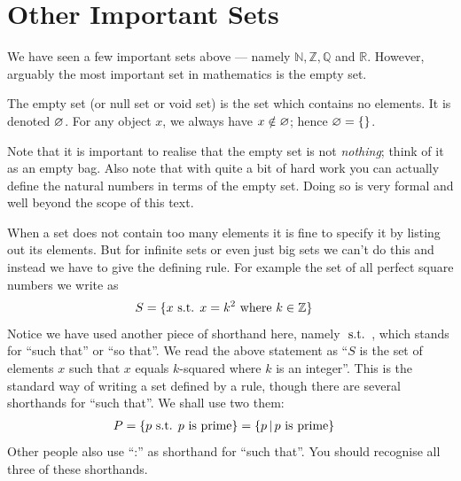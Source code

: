 \section{Other Important Sets}\label{sec_0_3}
We have seen a few important sets above --- namely $\mathbb{N}, \mathbb{Z},
\mathbb{Q}$ and $\mathbb{R}$. However, arguably the most important set in
mathematics is the empty set.
\begin{defn}\label{def_0_3_1}
  The empty set (or null set or void set) is the set which contains no
elements. It is denoted ${\varnothing}$. For any object $x$, we always
have $x \notin {\varnothing}$; hence ${\varnothing} = \{ \}$.
\end{defn}
Note that it is important to realise that the empty set is not \emph{nothing}; think of it
as an empty bag. Also note that with quite a bit of hard work you can actually define the
natural numbers in terms of the empty set. Doing so is very formal and well beyond the
scope of this text.


When a set does not contain too many elements it is fine to specify it by listing out its
elements.  But for infinite sets or even just big sets we can't do this and instead we
have to give the defining rule. For example the set of all perfect square numbers we
write as
\begin{align*}
  S &= \{x {\mbox{ s.t. }} x = k^2 \mbox{ where } k \in \mathbb{Z} \}
\end{align*}
Notice we have used another piece of shorthand here, namely ${\mbox{ s.t. }}$, which
stands for ``such that'' or ``so that''. We read the above statement as ``$S$ is
the set of elements $x$ such that $x$ equals $k$-squared where $k$ is an
integer''. This is the standard way of writing a set defined by a rule, though there are
several shorthands for ``such that''. We shall use two them:
\begin{align*}
  P &= \{ p {\mbox{ s.t. }} p \mbox{ is prime} \} = \{ p \,|\, p \mbox{ is prime} \}
\end{align*}
Other people also use ``:'' as shorthand for ``such that''. You should 
recognise all three of these shorthands.

